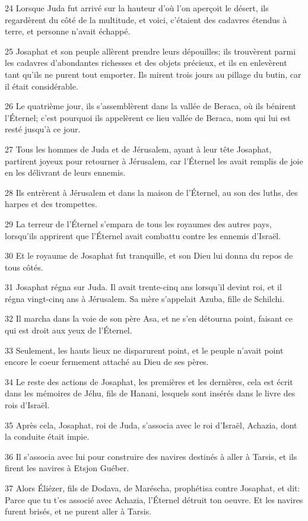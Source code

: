 \par 24 Lorsque Juda fut arrivé sur la hauteur d'où l'on aperçoit le désert, ils regardèrent du côté de la multitude, et voici, c'étaient des cadavres étendus à terre, et personne n'avait échappé.
\par 25 Josaphat et son peuple allèrent prendre leurs dépouilles; ils trouvèrent parmi les cadavres d'abondantes richesses et des objets précieux, et ils en enlevèrent tant qu'ils ne purent tout emporter. Ils mirent trois jours au pillage du butin, car il était considérable.
\par 26 Le quatrième jour, ils s'assemblèrent dans la vallée de Beraca, où ils bénirent l'Éternel; c'est pourquoi ils appelèrent ce lieu vallée de Beraca, nom qui lui est resté jusqu'à ce jour.
\par 27 Tous les hommes de Juda et de Jérusalem, ayant à leur tête Josaphat, partirent joyeux pour retourner à Jérusalem, car l'Éternel les avait remplis de joie en les délivrant de leurs ennemis.
\par 28 Ils entrèrent à Jérusalem et dans la maison de l'Éternel, au son des luths, des harpes et des trompettes.
\par 29 La terreur de l'Éternel s'empara de tous les royaumes des autres pays, lorsqu'ils apprirent que l'Éternel avait combattu contre les ennemis d'Israël.
\par 30 Et le royaume de Josaphat fut tranquille, et son Dieu lui donna du repos de tous côtés.
\par 31 Josaphat régna sur Juda. Il avait trente-cinq ans lorsqu'il devint roi, et il régna vingt-cinq ans à Jérusalem. Sa mère s'appelait Azuba, fille de Schilchi.
\par 32 Il marcha dans la voie de son père Asa, et ne s'en détourna point, faisant ce qui est droit aux yeux de l'Éternel.
\par 33 Seulement, les hauts lieux ne disparurent point, et le peuple n'avait point encore le coeur fermement attaché au Dieu de ses pères.
\par 34 Le reste des actions de Josaphat, les premières et les dernières, cela est écrit dans les mémoires de Jéhu, fils de Hanani, lesquels sont insérés dans le livre des rois d'Israël.
\par 35 Après cela, Josaphat, roi de Juda, s'associa avec le roi d'Israël, Achazia, dont la conduite était impie.
\par 36 Il s'associa avec lui pour construire des navires destinés à aller à Tarsis, et ils firent les navires à Etsjon Guéber.
\par 37 Alors Éliézer, fils de Dodava, de Maréscha, prophétisa contre Josaphat, et dit: Parce que tu t'es associé avec Achazia, l'Éternel détruit ton oeuvre. Et les navires furent brisés, et ne purent aller à Tarsis.


